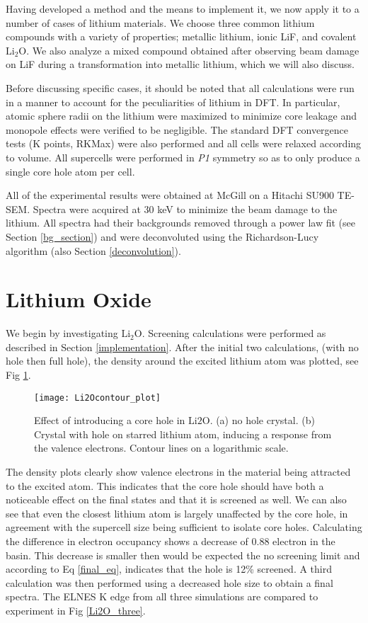 
Having developed a method and the means to implement it, we now apply it to a number of cases of lithium materials.   We choose three common lithium compounds with a variety of properties; metallic lithium, ionic LiF, and covalent $\mathrm{Li_2O}$.  We also analyze a mixed compound obtained after observing beam damage on LiF during a transformation into metallic lithium, which we will also discuss.  

Before discussing specific cases, it should be noted that all calculations were run in a manner to account for the peculiarities of lithium in DFT. In particular, atomic sphere radii on the lithium were maximized to minimize core leakage and monopole effects were verified to be negligible.  The standard DFT convergence tests (K points, RKMax) were also performed and all cells were relaxed according to volume.  All supercells were performed in \textit{P1} symmetry so as to only produce a single core hole atom per cell.  

All of the experimental results were obtained at McGill on a Hitachi SU900 TE-SEM.  Spectra were acquired at 30 keV to minimize the beam damage to the lithium.  All spectra had their backgrounds removed through a power law fit (see Section \ref{bg_section}) and were deconvoluted using the Richardson-Lucy algorithm (also Section \ref{deconvolution}).

\section{Lithium Oxide}

We begin by investigating $ \mathrm{Li_2O} $. Screening calculations were performed as described in Section \ref{implementation}.   After the initial two calculations, (with no hole then full hole), the density around the excited lithium atom was plotted, see Fig \ref{Li2O_contour}.  

\begin{figure}
	\centering
	\texttt{[image: Li2Ocontour\_plot]}
	\caption{Effect of introducing a core hole in $ \mathrm{Li2O} $.  (a) no hole crystal.  (b) Crystal with hole on starred lithium atom, inducing a response from the valence electrons.  Contour lines on a logarithmic scale. }
	\label{Li2O_contour}
\end{figure}

The density plots clearly show valence electrons in the material being attracted to the excited atom. This indicates that the core hole should have both a noticeable effect on the final states and that it is screened as well.  We can also see that even the closest lithium atom is largely unaffected by the core hole, in agreement with the supercell size being sufficient to isolate core holes.  Calculating the difference in electron occupancy shows a decrease of 0.88 electron in the basin.  This decrease is smaller then would be expected the no screening limit and according to Eq \ref{final_eq}, indicates that the hole is 12\% screened.  A third calculation was then performed using a decreased hole size to obtain a final spectra.  The ELNES K edge from all three simulations are compared to experiment in Fig \ref{Li2O_three}.  

